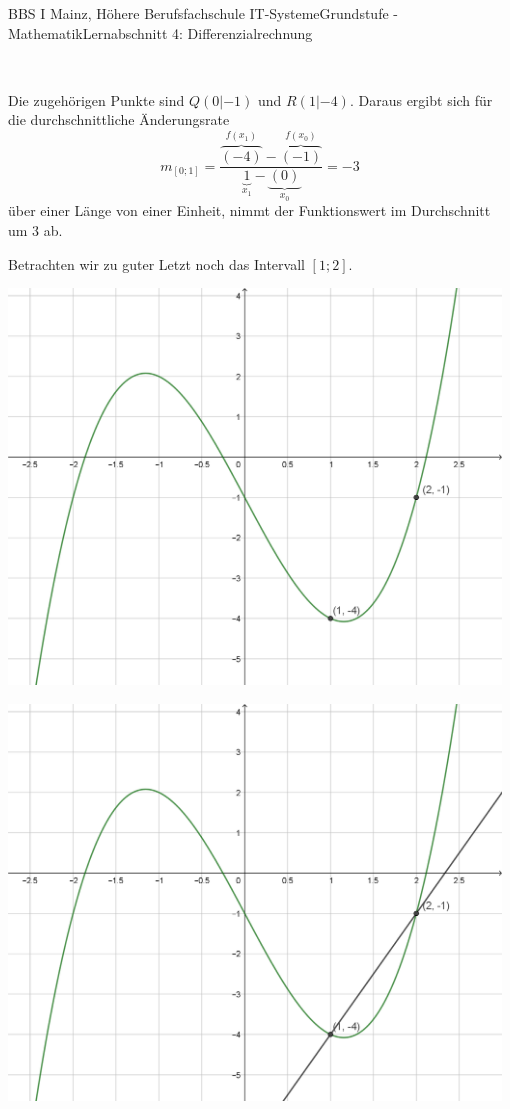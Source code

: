 \documentclass[11pt,twocolumn,oneside,openany,headings=optiontotoc,11pt,numbers=noenddot,final]{article}
\begin{document}
\begin{worksheet}{BBS I Mainz, Höhere Berufsfachschule IT-Systeme}{Grundstufe - Mathematik}{Lernabschnitt 4: Differenzialrechnung}
\begin{minipage}{0.2\textwidth}
		\end{minipage}\\
		\par\noindent
		Die zugehörigen Punkte sind \(Q(0|-1)\) und \(R(1|-4)\). Daraus ergibt sich für die durchschnittliche Änderungsrate
		\[m_{[0;1]} = \frac{\overbrace{(-4)}^{f(x_1)} - \overbrace{(-1)}^{f(x_0)}}{\underbrace{1}_{x_1} - \underbrace{(0)}_{x_0}} = -3\]
		über einer Länge von einer Einheit, nimmt der Funktionswert im Durchschnitt um \(3\) ab.\\
		\par\noindent
		Betrachten wir zu guter Letzt noch das Intervall \([1;2]\).\\
		\par\noindent
		\begin{minipage}{0.2\textwidth}
			\includegraphics[width=0.98\textwidth,align=t]{../99_Bilder/04_Skr_DifQuo2.png}
		\end{minipage}
		\hfill
		\begin{minipage}{0.2\textwidth}
			\includegraphics[width=0.98\textwidth,align=t]{../99_Bilder/04_Skr_DifQuo2_G.png}

\end{minipage}
\end{worksheet}
\end{document}
